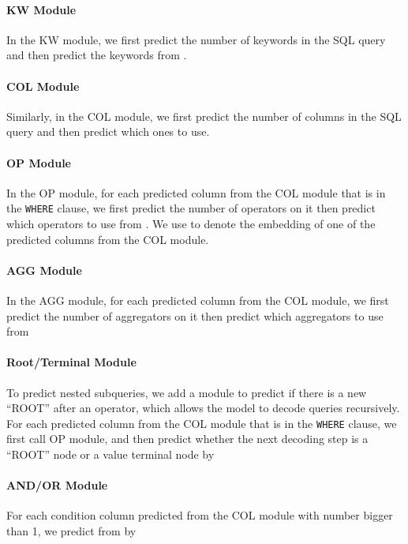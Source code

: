 \documentclass[11pt,a4paper]{article}
\begin{document}
\paragraph{KW Module}
In the KW module, we first predict the number of keywords in the SQL query and then predict the keywords from .


\paragraph{COL Module}
Similarly, in the COL module, we first predict the number of columns in the SQL query and then predict which ones to use.


\paragraph{OP Module}
In the OP module, for each predicted column from the COL module that is in the \texttt{WHERE} clause, we first predict the number of operators on it then predict which operators to use from .
We use  to denote the embedding of one of the predicted columns from the COL module.

\scalebox{0.75}{}

\scalebox{0.75}{}

\paragraph{AGG Module}
In the AGG module, for each predicted column from the COL module, we first predict the number of aggregators on it then predict which aggregators to use from 

\scalebox{0.75}{}

\scalebox{0.75}{}

\paragraph{Root/Terminal Module}
To predict nested subqueries, we add a module to predict if there is a new ``ROOT'' after an operator, which allows the model to decode queries recursively. For each predicted column from the COL module that is in the \texttt{WHERE} clause, we first call OP module, and then predict whether the next decoding step is a ``ROOT'' node or a value terminal node by


\paragraph{AND/OR Module}
For each condition column predicted from the COL module with number bigger than 1, we predict from  by
\end{document}
